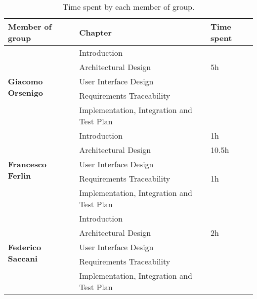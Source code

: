 \begin{table}[H]
    \centering
    \begin{tabular}{|l|l|l|}
        \hline
        \textbf{Member of group }                  & \textbf{Chapter}                          & \textbf{Time spent} \\\hline
        \multirow{5}{*}{\textbf{Giacomo Orsenigo}} & Introduction                              &                     \\
                                                   & Architectural Design                      & 5h                  \\
                                                   & User Interface Design                     &                     \\
                                                   & Requirements Traceability                 &                     \\
                                                   & Implementation, Integration and Test Plan &                     \\\hline
        \multirow{5}{*}{\textbf{Francesco Ferlin}} & Introduction                              & 1h                  \\
                                                   & Architectural Design                      & 10.5h               \\
                                                   & User Interface Design                     &                     \\
                                                   & Requirements Traceability                 & 1h                  \\
                                                   & Implementation, Integration and Test Plan &                     \\\hline
        \multirow{5}{*}{\textbf{Federico Saccani}} & Introduction                              &                     \\
                                                   & Architectural Design                      & 2h                  \\
                                                   & User Interface Design                     &                     \\
                                                   & Requirements Traceability                 &                     \\
                                                   & Implementation, Integration and Test Plan &                     \\\hline
    \end{tabular}
    \caption{Time spent by each member of group.}
    \label{table:Time spent}
\end{table}
